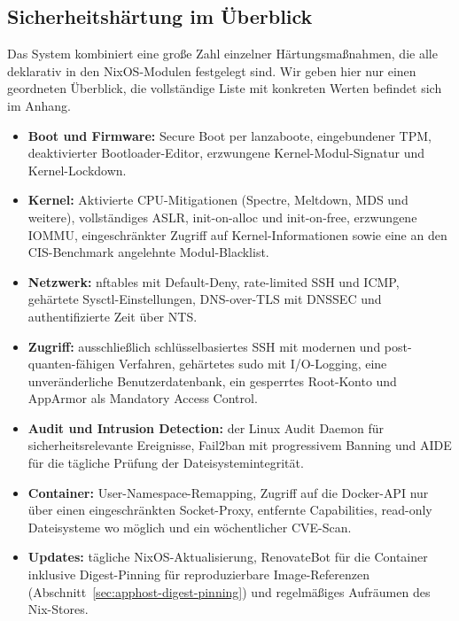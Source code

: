 \subsection{Sicherheitshärtung im Überblick}

Das System kombiniert eine große Zahl einzelner Härtungsmaßnahmen, die alle
deklarativ in den NixOS-Modulen festgelegt sind. Wir geben hier nur einen
geordneten Überblick, die vollständige Liste mit konkreten Werten befindet sich im Anhang.

\begin{itemize}
  \item \textbf{Boot und Firmware:} Secure Boot per lanzaboote, eingebundener
    \ac{TPM}, deaktivierter Bootloader-Editor, erzwungene Kernel-Modul-Signatur und
    Kernel-Lockdown.
  \item \textbf{Kernel:} Aktivierte \ac{CPU}-Mitigationen (Spectre, Meltdown, MDS und
    weitere), vollständiges \ac{ASLR}, init-on-alloc und init-on-free, erzwungene
    \ac{IOMMU}, eingeschränkter Zugriff auf Kernel-Informationen sowie eine an den
    \ac{CIS}-Benchmark angelehnte Modul-Blacklist.
  \item \textbf{Netzwerk:} nftables mit Default-Deny, rate-limited \ac{SSH} und
    \ac{ICMP}, gehärtete Sysctl-Einstellungen, \ac{DNS}-over-\ac{TLS} mit \ac{DNSSEC} und
    authentifizierte Zeit über \ac{NTS}.
  \item \textbf{Zugriff:} ausschließlich schlüsselbasiertes \ac{SSH} mit modernen
    und post-quanten-fähigen Verfahren, gehärtetes sudo mit I/O-Logging, eine
    unveränderliche Benutzerdatenbank, ein gesperrtes Root-Konto und AppArmor
    als Mandatory Access Control.
  \item \textbf{Audit und Intrusion Detection:} der Linux Audit Daemon für
    sicherheitsrelevante Ereignisse, Fail2ban mit progressivem Banning und \ac{AIDE}
    für die tägliche Prüfung der Dateisystemintegrität.
  \item \textbf{Container:} User-Namespace-Remapping, Zugriff auf die Docker-\ac{API}
    nur über einen eingeschränkten Socket-Proxy, entfernte Capabilities,
    read-only Dateisysteme wo möglich und ein wöchentlicher \ac{CVE}-Scan.
  \item \textbf{Updates:} tägliche NixOS-Aktualisierung, RenovateBot für die
    Container inklusive Digest-Pinning für reproduzierbare Image-Referenzen
    (Abschnitt~\ref{sec:apphost-digest-pinning}) und regelmäßiges Aufräumen des
    Nix-Stores.
\end{itemize}

